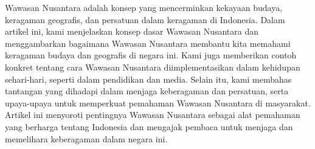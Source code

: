  Wawasan Nusantara adalah konsep yang mencerminkan kekayaan budaya, keragaman geografis, dan persatuan dalam keragaman di Indonesia. Dalam artikel ini, kami menjelaskan konsep dasar Wawasan Nusantara dan menggambarkan bagaimana Wawasan Nusantara membantu kita memahami keragaman budaya dan geografis di negara ini. Kami juga memberikan contoh konkret tentang cara Wawasan Nusantara diimplementasikan dalam kehidupan sehari-hari, seperti dalam pendidikan dan media. Selain itu, kami membahas tantangan yang dihadapi dalam menjaga keberagaman dan persatuan, serta upaya-upaya untuk memperkuat pemahaman Wawasan Nusantara di masyarakat. Artikel ini menyoroti pentingnya Wawasan Nusantara sebagai alat pemahaman yang berharga tentang Indonesia dan mengajak pembaca untuk menjaga dan memelihara keberagaman dalam negara ini.

